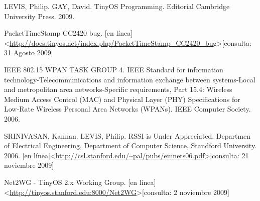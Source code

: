 \begin{thebibliography}{99}
\begin{sloppypar}
 LEVIS, Philip. GAY, David. TinyOS Programming. Editorial Cambridge University Press. 2009.

PacketTimeStamp CC2420 bug.
[en línea]\textless \url{http://docs.tinyos.net/index.php/PacketTimeStamp_CC2420_bug}\textgreater[consulta: 31 Agosto 2009] 

 IEEE 802.15 WPAN TASK GROUP 4. IEEE Standard for information technology-Telecommunications and information exchange between systems-Local and metropolitan area networks-Specific requirements, Part 15.4: Wireless Medium Access Control (MAC) and Physical Layer (PHY) Specifications for Low-Rate Wireless Personal Area Networks (WPANs). IEEE Computer Society. 2006.

 SRINIVASAN, Kannan. LEVIS, Philip. RSSI is Under Appreciated. Departmen of Electrical Engineering, Department of Computer Science, Standford University. 2006.
[en línea]\textless \url{http://csl.stanford.edu/~pal/pubs/emnets06.pdf}\textgreater[consulta: 21 noviembre 2009] 

 Net2WG - TinyOS 2.x Working Group.
[en línea]\textless \url{http://tinyos.stanford.edu:8000/Net2WG}\textgreater[consulta: 2 noviembre 2009] 

\end{sloppypar}
\end{thebibliography}
